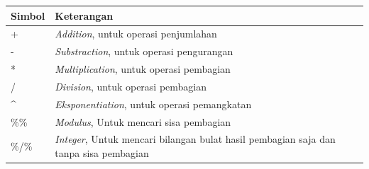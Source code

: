 \documentclass[]{book}
\begin{document}
\begin{longtable}[]{@{}ll@{}}
\toprule
\begin{minipage}[b]{0.15\columnwidth}\raggedright\strut
\textbf{Simbol}\strut
\end{minipage} & \begin{minipage}[b]{0.79\columnwidth}\raggedright\strut
\textbf{Keterangan}\strut
\end{minipage}\tabularnewline
\midrule
\endhead
\begin{minipage}[t]{0.15\columnwidth}\raggedright\strut
+\strut
\end{minipage} & \begin{minipage}[t]{0.79\columnwidth}\raggedright\strut
\emph{Addition}, untuk operasi penjumlahan\strut
\end{minipage}\tabularnewline
\begin{minipage}[t]{0.15\columnwidth}\raggedright\strut
-\strut
\end{minipage} & \begin{minipage}[t]{0.79\columnwidth}\raggedright\strut
\emph{Substraction}, untuk operasi pengurangan\strut
\end{minipage}\tabularnewline
\begin{minipage}[t]{0.15\columnwidth}\raggedright\strut
*\strut
\end{minipage} & \begin{minipage}[t]{0.79\columnwidth}\raggedright\strut
\emph{Multiplication}, untuk operasi pembagian\strut
\end{minipage}\tabularnewline
\begin{minipage}[t]{0.15\columnwidth}\raggedright\strut
/\strut
\end{minipage} & \begin{minipage}[t]{0.79\columnwidth}\raggedright\strut
\emph{Division}, untuk operasi pembagian\strut
\end{minipage}\tabularnewline
\begin{minipage}[t]{0.15\columnwidth}\raggedright\strut
\^{}\strut
\end{minipage} & \begin{minipage}[t]{0.79\columnwidth}\raggedright\strut
\emph{Eksponentiation}, untuk operasi pemangkatan\strut
\end{minipage}\tabularnewline
\begin{minipage}[t]{0.15\columnwidth}\raggedright\strut
\%\%\strut
\end{minipage} & \begin{minipage}[t]{0.79\columnwidth}\raggedright\strut
\emph{Modulus}, Untuk mencari sisa pembagian\strut
\end{minipage}\tabularnewline
\begin{minipage}[t]{0.15\columnwidth}\raggedright\strut
\%/\%\strut
\end{minipage} & \begin{minipage}[t]{0.79\columnwidth}\raggedright\strut
\emph{Integer}, Untuk mencari bilangan bulat hasil pembagian saja dan
tanpa sisa pembagian\strut
\end{minipage}\tabularnewline
\bottomrule
\end{longtable}
\end{document}
